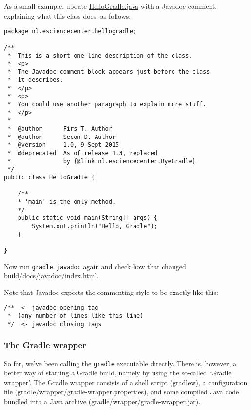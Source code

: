 As a small example, update \url{HelloGradle.java} with a Javadoc comment, explaining what this class does, as follows:
\begin{lstlisting}[style=basic,style=bash]
package nl.esciencecenter.hellogradle;

/**
 *  This is a short one-line description of the class.
 *  <p>
 *  The Javadoc comment block appears just before the class
 *  it describes.
 *  </p>
 *  <p>
 *  You could use another paragraph to explain more stuff.
 *  </p>
 *
 *  @author      Firs T. Author
 *  @author      Secon D. Author
 *  @version     1.0, 9-Sept-2015
 *  @deprecated  As of release 1.3, replaced
 *               by {@link nl.esciencecenter.ByeGradle}
 */
public class HelloGradle {

    /**
    * 'main' is the only method.
    */
    public static void main(String[] args) {
        System.out.println("Hello, Gradle");
    }

}
\end{lstlisting}

Now run \texttt{gradle javadoc} again and check how that changed \url{build/docs/javadoc/index.html}.

Note that Javadoc expects the commenting style to be exactly like this:
\begin{lstlisting}[style=basic,style=bash]
/**  <- javadoc opening tag
 *  (any number of lines like this line)
 */  <- javadoc closing tags
\end{lstlisting}



\subsubsection{The Gradle wrapper}


So far, we've been calling the \texttt{gradle} executable directly. There is, however, a better way of starting a Gradle build, namely by using the so-called `Gradle wrapper'. The Gradle wrapper consists of a shell script (\url{gradlew}), a configuration file (\url{gradle/wrapper/gradle-wrapper.properties}), and some compiled Java code bundled into a Java archive (\url{gradle/wrapper/gradle-wrapper.jar}).


